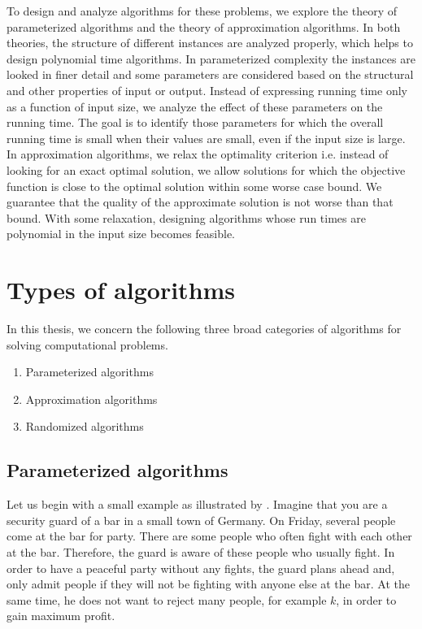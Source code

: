 To design and analyze algorithms for these problems, we explore the theory of parameterized algorithms and the theory of approximation algorithms.
In both theories, the structure of different instances are analyzed properly, which helps to design polynomial time algorithms.
In parameterized complexity the instances are looked in finer detail and some parameters are considered based on the structural and other properties of input or output.
Instead of expressing running time only as a function
of input size, we analyze the effect of these parameters on the running time. 
The goal is to identify those parameters for which the overall running time is small when their values are small, even if the input size is large. 
In approximation algorithms, we relax the optimality criterion i.e. instead of looking for an exact optimal solution,
we allow solutions for which the objective function is close to the optimal solution within some worse case bound.
We guarantee that the quality of the approximate solution is not worse than that bound.
With some relaxation, designing algorithms whose run times are polynomial in the input size becomes feasible. 

\section{Types of algorithms}
In this thesis, we concern the following three broad categories of algorithms for solving computational problems.
\begin{enumerate}
 \item Parameterized algorithms
 \item Approximation algorithms 
 \item Randomized algorithms
\end{enumerate}

\subsection{Parameterized algorithms}
Let us begin with a small example as illustrated by \cite{cygan2015parameterized}. 
Imagine that you are a security guard of a bar
in a small town of Germany. On Friday, several people come at the bar for party. 
There are some people who often fight with each other at the bar. Therefore, the guard is aware of these people who usually fight.
In order to have a peaceful party without any fights, the guard plans ahead and,
only admit people if they will not be fighting with anyone else at the
bar. At the same time, he does not want to reject many people, for example $k$, in order to gain maximum profit.

